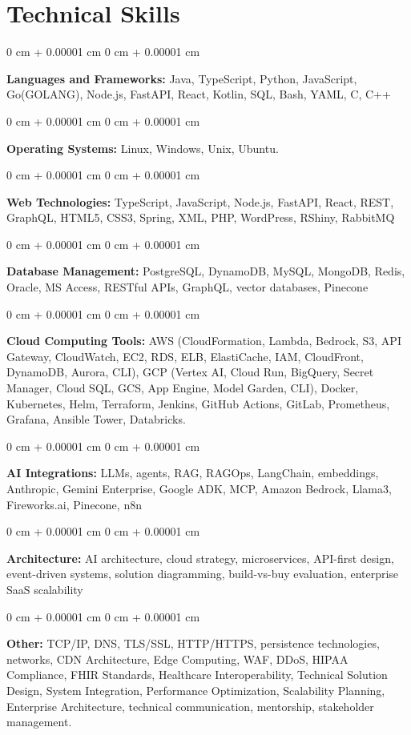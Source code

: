 \documentclass[10pt, letterpaper]{article}
\newenvironment{onecolentry}{
    \begin{adjustwidth}{
        0 cm + 0.00001 cm
    }{
        0 cm + 0.00001 cm
    }
}{
    \end{adjustwidth}
} %
\begin{document}
    \section{Technical Skills}
    \vspace{2 pt }
    \begin{onecolentry}
    \textbf{Languages and Frameworks:} Java, TypeScript, Python, JavaScript, Go(GOLANG), Node.js, FastAPI, React, Kotlin, SQL, Bash, YAML, C, C++
    \end{onecolentry}
    \begin{onecolentry}
        \textbf{Operating Systems:} Linux, Windows, Unix, Ubuntu.
    \end{onecolentry}
    \begin{onecolentry}
         \textbf{Web Technologies:} TypeScript, JavaScript, Node.js, FastAPI, React, REST, GraphQL, HTML5, CSS3, Spring, XML, PHP, WordPress, RShiny, RabbitMQ
    \end{onecolentry}
    \begin{onecolentry}
        \textbf{Database Management:} PostgreSQL, DynamoDB, MySQL, MongoDB, Redis, Oracle, MS Access, RESTful APIs, GraphQL, vector databases, Pinecone
    \end{onecolentry}
    \begin{onecolentry}
        \textbf{Cloud Computing Tools:}
AWS (CloudFormation, Lambda, Bedrock, S3, API Gateway, CloudWatch, EC2, RDS, ELB, ElastiCache, IAM, CloudFront, DynamoDB, Aurora, CLI), GCP (Vertex AI, Cloud Run, BigQuery, Secret Manager, Cloud SQL, GCS, App Engine, Model Garden, CLI), Docker, Kubernetes, Helm, Terraform, Jenkins, GitHub Actions, GitLab, Prometheus, Grafana, Ansible Tower, Databricks.
    \end{onecolentry}
    \begin{onecolentry}
         \textbf{AI Integrations:} LLMs, agents, RAG, RAGOps, LangChain, embeddings, Anthropic, Gemini Enterprise, Google ADK, MCP, Amazon Bedrock, Llama3, Fireworks.ai, Pinecone, n8n
    \end{onecolentry}
    \begin{onecolentry}
        \textbf{Architecture:} AI architecture, cloud strategy, microservices, API-first design, event-driven systems, solution diagramming, build-vs-buy evaluation, enterprise SaaS scalability
    \end{onecolentry}
        \begin{onecolentry}
     \textbf{Other:} TCP/IP, DNS, TLS/SSL, HTTP/HTTPS, persistence technologies, networks, CDN Architecture, Edge Computing, WAF, DDoS, HIPAA Compliance, FHIR Standards, Healthcare Interoperability, Technical Solution Design, System Integration, Performance Optimization, Scalability Planning, Enterprise Architecture, technical communication, mentorship, stakeholder management.
    \end{onecolentry}
\end{document}
